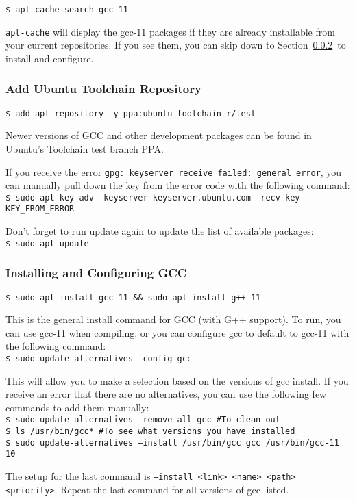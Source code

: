 \texttt{\$\ apt-cache search gcc-11}

\texttt{apt-cache} will display the gcc-11 packages if they are already installable from your current repositories. If you see them, you can skip down to Section~\ref{sec:20211220:install}\ to install and configure.

\subsubsection{Add Ubuntu Toolchain Repository}

\texttt{\$\ add-apt-repository -y ppa:ubuntu-toolchain-r/test}

Newer versions of GCC and other development packages can be found in Ubuntu's Toolchain test branch PPA.

If you receive the error \texttt{gpg: keyserver receive failed: general error}, you can manually pull down the key from the error code with the following command:\\
\texttt{\$\ sudo apt-key adv --keyserver keyserver.ubuntu.com --recv-key KEY\_FROM\_ERROR}

Don't forget to run update again to update the list of available packages:\\
\texttt{\$\ sudo apt update}

\subsubsection{Installing and Configuring GCC}
\label{sec:20211220:install}

\texttt{\$\ sudo apt install gcc-11 \&\& sudo apt install g++-11}

This is the general install command for GCC (with G++ support). To run, you can use gcc-11 when compiling, or you can configure gcc to default to gcc-11 with the following command:\\
\texttt{\$\ sudo update-alternatives --config gcc}

This will allow you to make a selection based on the versions of gcc install. If you receive an error that there are no alternatives, you can use the following few commands to add them manually:\\
\texttt{\$\ sudo update-alternatives --remove-all gcc \#To clean out}\\
\texttt{\$\ ls /usr/bin/gcc* \#To see what versions you have installed}\\
\texttt{\$\ sudo update-alternatives --install /usr/bin/gcc gcc /usr/bin/gcc-11 10}

The setup for the last command is \texttt{--install <link> <name> <path> <priority>}. Repeat the last command for all versions of gcc listed. 

